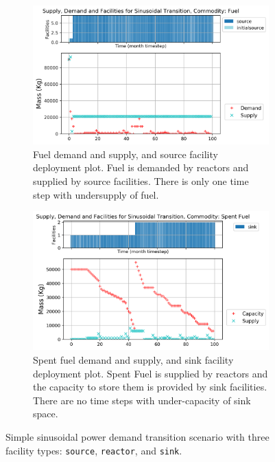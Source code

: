     \begin{figure}[]
        \centering
        \begin{subfigure}[t]{\textwidth}
            \centering
            \includegraphics[width=0.8\linewidth]{figures/sinetransition-fuel.png} 
            \caption{Fuel demand and supply, and source facility deployment plot.
            Fuel is demanded by reactors and supplied by source facilities.
            There is only one time step with undersupply of fuel.}
            \label{fig:sinetransition-fuel}
        \end{subfigure}
        \begin{subfigure}[t]{\textwidth}
            \centering
            \includegraphics[width=0.8\linewidth]{figures/sinetransition-spentfuel.png} 
            \caption{Spent fuel demand and supply, and sink facility deployment plot.
                Spent Fuel is supplied by reactors and the capacity to store them 
                is provided by sink facilities.
            There are no time steps with under-capacity of sink space.}
            \label{fig:sinetransition-spentfuel}
        \end{subfigure}
        \caption{Simple sinusoidal power demand transition scenario with 
        three facility types: \texttt{source}, \texttt{reactor}, and \texttt{sink}.}
    \end{figure}

